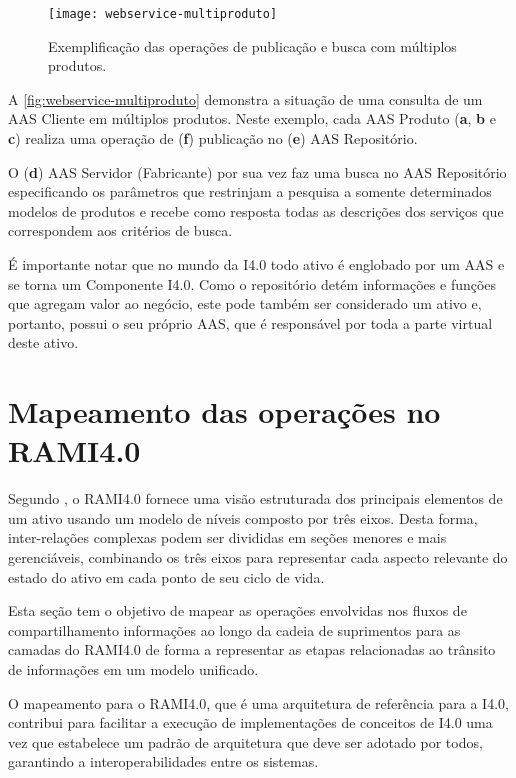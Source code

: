 	\begin{figure}[htb]
		\centering
		\label{fig:webservice-multiproduto}
		\texttt{[image: webservice-multiproduto]}
		\caption{Exemplificação das operações de publicação e busca com múltiplos produtos.}
	\end{figure}
	
	A \autoref{fig:webservice-multiproduto} demonstra a situação de uma consulta de um AAS Cliente em múltiplos produtos. Neste exemplo, cada AAS Produto (\textbf{a}, \textbf{b} e \textbf{c}) realiza uma operação de (\textbf{f}) publicação no (\textbf{e}) AAS Repositório. 
	
	O (\textbf{d}) AAS Servidor (Fabricante) por sua vez faz uma busca no AAS Repositório especificando os parâmetros que restrinjam a pesquisa a somente determinados modelos de produtos e recebe como resposta todas as descrições dos serviços que correspondem aos critérios de busca.
	
	É importante notar que no mundo da I4.0 todo ativo é englobado por um AAS e se torna um Componente I4.0. Como o repositório detém informações e funções que agregam valor ao negócio, este pode também ser considerado um ativo e, portanto, possui o seu próprio AAS, que é responsável por toda a parte virtual deste ativo.
	
\section{Mapeamento das operações no RAMI4.0}
	
	Segundo , o RAMI4.0 fornece uma visão estruturada dos principais elementos de um ativo usando um modelo de níveis composto por três eixos. Desta forma, inter-relações complexas podem ser divididas em seções menores e mais gerenciáveis, combinando os três eixos para representar cada aspecto relevante do estado do ativo em cada ponto de seu ciclo de vida.
	
	Esta seção tem o objetivo de mapear as operações envolvidas nos fluxos de compartilhamento informações ao longo da cadeia de suprimentos para as camadas do RAMI4.0 de forma a representar as etapas relacionadas ao trânsito de informações em um modelo unificado.
	
	O mapeamento para o RAMI4.0, que é uma arquitetura de referência para a I4.0, contribui para facilitar a execução de implementações de conceitos de I4.0 uma vez que estabelece um padrão de arquitetura que deve ser adotado por todos, garantindo a interoperabilidades entre os sistemas.
	
